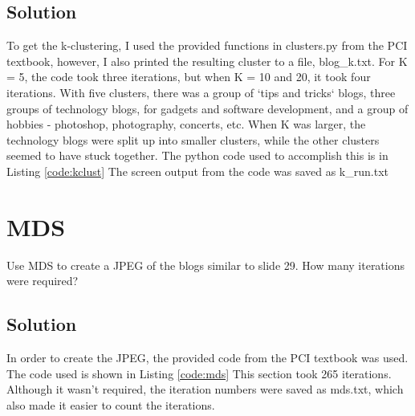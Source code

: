 \documentclass[paper=a4, fontsize=11pt]{scrartcl} %
\numberwithin{equation}{section} %
\numberwithin{figure}{section} %
\numberwithin{table}{section} %
\begin{document}
\subsection{Solution}
To get the k-clustering, I used the provided functions in clusters.py from the PCI textbook, however, 
I also printed the resulting cluster to a file, blog\_k.txt.
For K = 5, the code took three iterations, but when K = 10 and 20, it took four iterations.
With five clusters, there was a group of `tips and tricks` blogs, three groups of technology blogs, for gadgets and software development, and a group of hobbies - photoshop, photography, concerts, etc.
When K was larger, the technology blogs were split up into smaller clusters, while the other clusters seemed to have stuck together.
The python code used to accomplish this is in Listing \ref{code:kclust}
The screen output from the code was saved as k\_run.txt\\



\section{MDS}
Use MDS to create a JPEG of the blogs similar to slide 29.  
How many iterations were required?

\subsection{Solution}
In order to create the JPEG, the provided code from the PCI textbook was used.
The code used is shown in Listing \ref{code:mds}
This section took 265 iterations.
Although it wasn't required, the iteration numbers were saved as mds.txt, which also made it easier to count the iterations.\\


\end{document}
